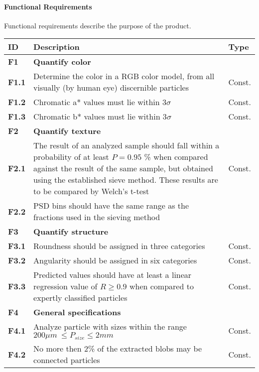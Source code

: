 \documentclass[11pt,fleqn,,a4paper,twoside,openright]{book}
\begin{document}
\paragraph{Functional Requirements}
Functional requirements describe the purpose of the product.

\begin{longtable}{|p{1cm}| p{10cm} p{1.5cm}|}
\hline 
\textbf{ID} & \textbf{Description} & \textbf{Type} \\
\endhead
\hline
\textbf{F1}\label{F1} & \textbf{Quantify color} &  \\ 
\hline 
\textbf{F1.1}\label{F1.1} & Determine the color in a RGB color model, from all visually (by human eye) discernible particles & Const. \\ 
\hline
\textbf{F1.2}\label{F1.2} & Chromatic a* values must lie within $3 \sigma$ & Const. \\ 
\hline 
\textbf{F1.3}\label{F1.3} & Chromatic b* values must lie within $3 \sigma$ & Const. \\ 
\hline 
\textbf{F2}\label{F2} & \textbf{Quantify texture} &  \\ 
\hline 
\textbf{F2.1}\label{F2.1} & The result of an analyzed sample should fall within a probability of at least $P = 0.95$ \% when compared against the result of the same sample, but obtained using the established sieve method. These results are to be compared by Welch's t-test  &  Const. \\ 
\hline 
\textbf{F2.2}\label{F2.2} & PSD bins should have the same range as the fractions used in the sieving method & \\
\hline 
\textbf{F3}\label{F3} & \textbf{Quantify structure}  &  \\ 
\hline 
\textbf{F3.1}\label{F3.1} & Roundness should be assigned in three categories  & Const. \\ 
\hline 
\textbf{F3.2}\label{F3.2} & Angularity should be assigned in six categories  & Const. \\ 
\hline 
\textbf{F3.3}\label{F3.3} & Predicted values should have at least a linear regression value of $ R \geq 0.9 $ when compared to expertly classified particles & Const.  \\ 
\hline 
\textbf{F4}\label{F4} & \textbf{General specifications} &  \\ 
\hline 
\textbf{F4.1}\label{F4.1} & Analyze particle with sizes within the range $ 200 \mu m\ \leq P_{size} \leq 2 mm $& Const. \\ 
\hline 
\textbf{F4.2}\label{F4.2} & No more then 2\% of the extracted blobs may be connected particles & Const. \\ 

\end{longtable}
\end{document}
